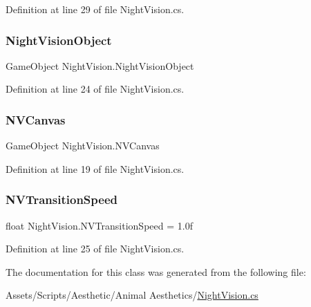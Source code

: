 Definition at line 29 of file Night\+Vision.\+cs.

\mbox{\label{class_night_vision_a0319e6f51ca09217bad8cad12e2f07ed}} 
\subsubsection{\texorpdfstring{Night\+Vision\+Object}{NightVisionObject}}
{\footnotesize\ttfamily Game\+Object Night\+Vision.\+Night\+Vision\+Object}



Definition at line 24 of file Night\+Vision.\+cs.

\mbox{\label{class_night_vision_a87df66ec5cac946275ed12e40cd8b20a}} 
\subsubsection{\texorpdfstring{N\+V\+Canvas}{NVCanvas}}
{\footnotesize\ttfamily Game\+Object Night\+Vision.\+N\+V\+Canvas}



Definition at line 19 of file Night\+Vision.\+cs.

\mbox{\label{class_night_vision_af1b09dce6c363ac1db1ad09e54bcc181}} 
\subsubsection{\texorpdfstring{N\+V\+Transition\+Speed}{NVTransitionSpeed}}
{\footnotesize\ttfamily float Night\+Vision.\+N\+V\+Transition\+Speed = 1.\+0f}



Definition at line 25 of file Night\+Vision.\+cs.



The documentation for this class was generated from the following file\+:\begin{DoxyCompactItemize}
\item 
Assets/\+Scripts/\+Aesthetic/\+Animal Aesthetics/\mbox{\hyperlink{_night_vision_8cs}{Night\+Vision.\+cs}}\end{DoxyCompactItemize}
